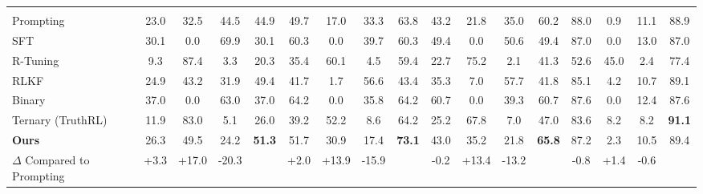 \documentclass{article} %
\begin{document}
\begin{table}[t]
{\begin{tabular}{l cccc cccc cccc cccc}
    \midrule
    \rowcolor{myyellow}
    \multicolumn{17}{c}{\textbf{Qwen2.5-7B-Inst}} \\
    
    \quad Prompting 
    & 23.0 & 32.5 & 44.5 & 44.9
    & 49.7 & 17.0 & 33.3 & 63.8
    & 43.2 & 21.8 & 35.0 & 60.2
    & 88.0 & 0.9 & 11.1 & 88.9\\
    
    \quad SFT 
    & 30.1 & 0.0 & 69.9 & 30.1
    & 60.3 & 0.0 & 39.7 & 60.3
    & 49.4 & 0.0 & 50.6 & 49.4
    & 87.0 & 0.0 & 13.0 & 87.0\\
    
    \quad R-Tuning 
    & 9.3 & 87.4 & 3.3 & 20.3
    & 35.4 & 60.1 & 4.5 & 59.4
    & 22.7 & 75.2 & 2.1 & 41.3
    & 52.6 & 45.0 & 2.4 & 77.4\\
    
    
    \quad RLKF 
    & 24.9 & 43.2 & 31.9 & 49.4
    & 41.7 & 1.7 & 56.6 & 43.4
    & 35.3 & 7.0 & 57.7 & 41.8
    & 85.1 & 4.2 & 10.7 & 89.1\\
    \hdashline[2pt/3pt]
    \quad Binary
    & 37.0 & 0.0 & 63.0 & 37.0
    & 64.2 & 0.0 & 35.8 & 64.2
    & 60.7 & 0.0 & 39.3 & 60.7
    & 87.6 & 0.0 & 12.4 & 87.6\\
    
    \quad Ternary {\scriptsize (TruthRL)}
    & 11.9 & 83.0 & 5.1 & 26.0
    & 39.2 & 52.2 & 8.6 & 64.2
    & 25.2 & 67.8 & 7.0 & 47.0
    & 83.6 & 8.2 & 8.2 & \textbf{91.1}\\\rowcolor{blue!5} \quad \textbf{Ours} 
    & 26.3 & 49.5 & 24.2 & \textbf{51.3}
    & 51.7 & 30.9 & 17.4 & \textbf{73.1}
    & 43.0 & 35.2 & 21.8 & \textbf{65.8}
    & 87.2 & 2.3 & 10.5 & 89.4 \\\rowcolor{blue!5}$\Delta$ Compared to Prompting
    & +3.3 & +17.0 & -20.3 & \color{green!60!black}{+6.4}
    & +2.0 & +13.9 & -15.9 & \color{green!60!black}{+9.3}
    & -0.2 & +13.4 & -13.2 & \color{green!60!black}{+5.6}
    & -0.8 & +1.4 & -0.6 & \color{green!60!black}{+0.5}\\
    

\end{tabular}}
\end{table}
\end{document}
